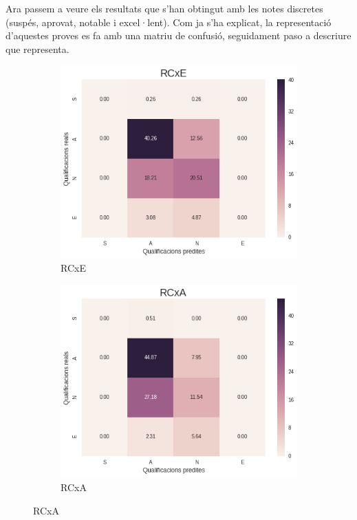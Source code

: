 \documentclass[12pt,a4paper,catalan]{article}
\begin{document}
\newpage

Ara passem a veure els resultats que s'han obtingut amb les notes discretes (suspés, aprovat, notable i excel·lent). Com ja s'ha explicat, la representació d'aquestes proves es fa amb una matriu de confusió, seguidament paso a descriure que representa.

\begin{figure}[h]
\centering
\begin{subfigure}{.48\textwidth}
  \centering
  \includegraphics[width=\linewidth]{img/heatmap_rcxe_primer_segon.png}
  \caption{RCxE}
\end{subfigure}
\begin{subfigure}{.48\textwidth}
  \centering
  \includegraphics[width=\linewidth]{img/heatmap_rcxa_primer_segon.png}
  \caption{RCxA}
\end{subfigure}
\end{figure}
\end{document}

